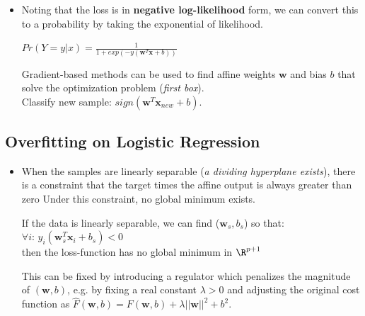 \documentclass[english]{latex4ei/latex4ei_sheet}
\begin{document}
\begin{sectionbox}
\begin{itemize}
\begin{center}
\end{center}
\item Noting that the loss is in \textbf{negative log-likelihood} form, we can convert this to a probability by taking the exponential of likelihood.
\begin{emphbox}
    \begin{center}
        $Pr(Y=y|x)=\frac{1}{1+exp(-y(\boldsymbol{w}^T\boldsymbol{x}+b))}$
    \end{center}
\end{emphbox}
Gradient-based methods can be used to find affine weights $\boldsymbol{w}$ and bias $b$ that solve the optimization problem (\emph{first box}).\\ Classify new sample: $sign(\boldsymbol{w}^{T}\boldsymbol{x}_{new}+b)$.
\end{itemize}

\subsection{Overfitting on Logistic Regression}
\begin{itemize}
\item When the samples are linearly separable (\emph{a dividing hyperplane exists}), there is a constraint that the target times the affine output is always greater than zero Under this constraint, no global minimum exists.
\begin{emphbox}
    If the data is linearly separable, we can find ($\boldsymbol{w}_s,b_s$) so that: $\forall i:\,y_i(\boldsymbol{w}_s^T\boldsymbol{x}_i+b_s)<0$ \\
    then the loss-function has no global minimum in $\R^{p+1}$
\end{emphbox}
This can be fixed by introducing a regulator which penalizes the magnitude of $(\boldsymbol{w}, b)$, e.g. by fixing a real constant $\lambda>0$ and adjusting the original cost function as  $\hat{F}(\boldsymbol{w}, b)=F(\boldsymbol{w}, b)+\lambda||\boldsymbol{w}||^2+b^2$.
\end{itemize}


\end{sectionbox}
\end{document}
